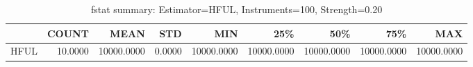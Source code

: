 \begin{table}[ht]
\centering
\caption{fstat summary: Estimator=HFUL, Instruments=100, Strength=0.20}
\begin{tabular}{lrrrrrrrr}
\toprule
 & COUNT & MEAN & STD & MIN & 25\% & 50\% & 75\% & MAX \\
\midrule
HFUL & 10.0000 & 10000.0000 & 0.0000 & 10000.0000 & 10000.0000 & 10000.0000 & 10000.0000 & 10000.0000 \\
\bottomrule
\end{tabular}
\end{table}
